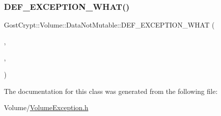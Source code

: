 \subsubsection{\texorpdfstring{D\+E\+F\+\_\+\+E\+X\+C\+E\+P\+T\+I\+O\+N\+\_\+\+W\+H\+A\+T()}{DEF\_EXCEPTION\_WHAT()}}
{\footnotesize\ttfamily Gost\+Crypt\+::\+Volume\+::\+Data\+Not\+Mutable\+::\+D\+E\+F\+\_\+\+E\+X\+C\+E\+P\+T\+I\+O\+N\+\_\+\+W\+H\+AT (\begin{DoxyParamCaption}\item[{\hyperlink{class_gost_crypt_1_1_volume_1_1_data_not_mutable}{Data\+Not\+Mutable}}]{,  }\item[{\hyperlink{class_gost_crypt_1_1_volume_1_1_volume_exception}{Volume\+Exception}}]{,  }\item[{\char`\"{}The buffer was created with a cont buffer but is not const itself and you\textquotesingle{}re trying to access it.\char`\"{}}]{ }\end{DoxyParamCaption})}



The documentation for this class was generated from the following file\+:\begin{DoxyCompactItemize}
\item 
Volume/\hyperlink{_volume_exception_8h}{Volume\+Exception.\+h}\end{DoxyCompactItemize}
